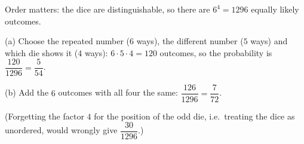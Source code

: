 Order matters: the dice are distinguishable, so there are $6^4=1296$ equally likely outcomes.

(a) Choose the repeated number ($6$ ways), the different number ($5$ ways) and which die shows it ($4$ ways): $6\cdot5\cdot4=120$ outcomes, so the probability is $\dfrac{120}{1296}=\boxed{\dfrac{5}{54}}$.

(b) Add the $6$ outcomes with all four the same: $\dfrac{126}{1296}=\boxed{\dfrac{7}{72}}$.

(Forgetting the factor $4$ for the position of the odd die, i.e.\ treating the dice as unordered, would wrongly give $\dfrac{30}{1296}$.)
